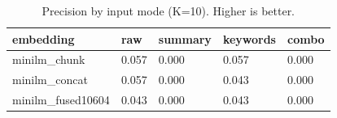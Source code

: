 \begin{table}
\caption{Precision by input mode (K=10). Higher is better.}
\label{tab:precision-by-mode}
\begin{tabular}{lllll}
\toprule
embedding & raw & summary & keywords & combo \\
\midrule
minilm_chunk & 0.057 & 0.000 & 0.057 & 0.000 \\
minilm_concat & 0.057 & 0.000 & 0.043 & 0.000 \\
minilm_fused10604 & 0.043 & 0.000 & 0.043 & 0.000 \\
\bottomrule
\end{tabular}
\end{table}
